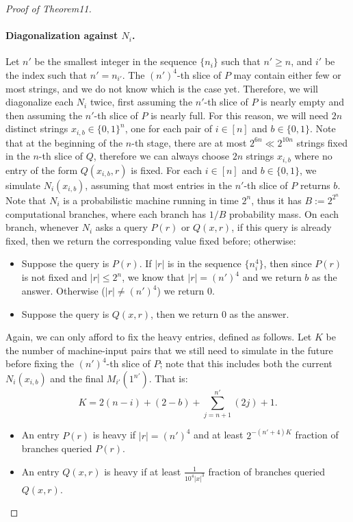 \begin{proof}[Proof of Theorem11]
\paragraph{Diagonalization against $N_i$.}
Let $n'$ be the smallest integer in the sequence $\{n_i\}$ such that $n'\geq n$, and $i'$ be the index such that $n'=n_{i'}$. The $(n')^4$-th slice of $P$ may contain either few or most strings, and we do not know which is the case yet. Therefore, we will diagonalize each $N_i$ twice, first assuming the $n'$-th slice of $P$ is nearly empty and then assuming the $n'$-th slice of $P$ is nearly full. For this reason, we will need $2n$ distinct strings $x_{i,b}\in\{0,1\}^n$, one for each pair of $i\in[n]$ and $b\in\{0,1\}$. Note that at the beginning of the $n$-th stage, there are at most $2^{6n}\ll2^{10n}$ strings fixed in the $n$-th slice of $Q$, therefore we can always choose $2n$ strings $x_{i,b}$ where no entry of the form $Q(x_{i,b},r)$ is fixed.
For each $i\in[n]$ and $b\in\{0,1\}$, we simulate $N_i(x_{i,b})$, assuming that most entries in the $n'$-th slice of $P$ returns $b$. Note that $N_i$ is a probabilistic machine running in time $2^n$, thus it has $B:=2^{2^n}$ computational branches, where each branch has $1/B$ probability mass. On each branch, whenever $N_i$ asks a query $P(r)$ or $Q(x,r)$, if this query is already fixed, then we return the corresponding value fixed before; otherwise:
\begin{itemize}
\item Suppose the query is $P(r)$. If $|r|$ is in the sequence $\{n_i^4\}$, then since $P(r)$ is not fixed and $|r|\leq2^n$, we know that $|r|=(n')^4$ and we return $b$ as the answer. Otherwise ($|r|\neq(n')^4$) we return $0$.
\item Suppose the query is $Q(x,r)$, then we return $0$ as the answer.
\end{itemize}
Again, we can only afford to fix the heavy entries, defined as follows. Let $K$ be the number of machine-input pairs that we still need to simulate in the future before fixing the $(n')^4$-th slice of $P$; note that this includes both the current $N_i(x_{i,b})$ and the final $M_{i'}(1^{n'})$. That is:
\[K=2(n-i)+(2-b)+\sum_{j=n+1}^{n'}(2j)+1.\]
\begin{itemize}
\item An entry $P(r)$ is heavy if $|r|=(n')^4$ and at least $2^{-(n'+4)K}$ fraction of branches queried $P(r)$.
\item An entry $Q(x,r)$ is heavy if at least $\frac{1}{10^4|x|^3}$ fraction of branches queried $Q(x,r)$.

\end{itemize}
\end{proof}

